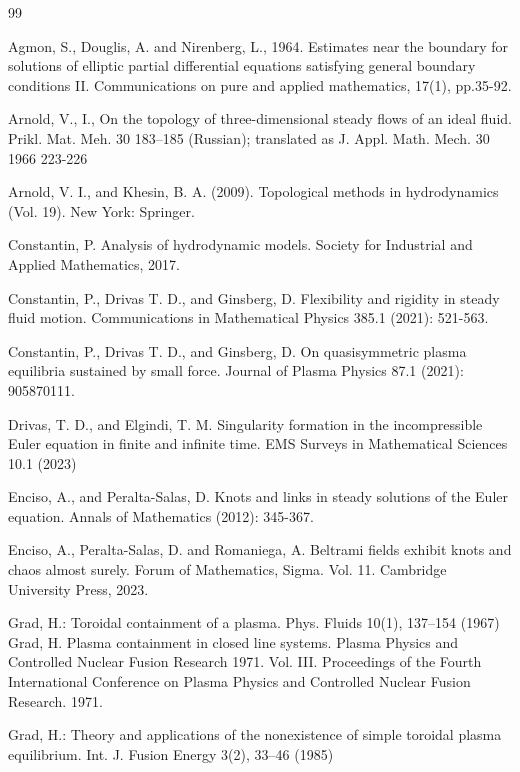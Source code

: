 \documentclass[11pt]{article}
\theoremstyle{plain}
\numberwithin{equation}{section}
\theoremstyle{remark}
\begin{document}
\begin{thebibliography}{99}

Agmon, S., Douglis, A. and Nirenberg, L., 1964. Estimates near the boundary for solutions of elliptic partial differential equations satisfying general boundary conditions II. Communications on pure and applied mathematics, 17(1), pp.35-92.

Arnold, V., I., On the topology of three-dimensional steady flows of an ideal fluid. Prikl.
Mat. Meh. 30 183–185 (Russian); translated as J. Appl. Math. Mech. 30 1966 223-226

Arnold, V. I., and Khesin, B. A. (2009). Topological methods in hydrodynamics (Vol. 19). New York: Springer.


Constantin, P. Analysis of hydrodynamic models. Society for Industrial and Applied Mathematics, 2017.

Constantin, P., Drivas T. D., and Ginsberg, D. Flexibility and rigidity in steady fluid motion. Communications in Mathematical Physics 385.1 (2021): 521-563.

 Constantin, P., Drivas T. D., and Ginsberg, D. On quasisymmetric plasma equilibria sustained by small force. Journal of Plasma Physics 87.1 (2021): 905870111.

Drivas, T. D., and Elgindi, T. M.  Singularity formation in the incompressible Euler equation in finite and infinite time. EMS Surveys in Mathematical Sciences 10.1 (2023)


Enciso, A., and Peralta-Salas, D. Knots and links in steady solutions of the Euler equation. Annals of Mathematics (2012): 345-367.


Enciso, A.,  Peralta-Salas, D.  and  Romaniega, A. Beltrami fields exhibit knots and chaos almost surely. Forum of Mathematics, Sigma. Vol. 11. Cambridge University Press, 2023.


Grad, H.: Toroidal containment of a plasma. Phys. Fluids 10(1), 137–154 (1967)
Grad, H. Plasma containment in closed line systems. Plasma Physics and Controlled Nuclear Fusion Research 1971. Vol. III. Proceedings of the Fourth International Conference on Plasma Physics and Controlled Nuclear Fusion Research. 1971.

Grad, H.: Theory and applications of the nonexistence of simple toroidal plasma equilibrium. Int. J. Fusion
Energy 3(2), 33–46 (1985)



\end{thebibliography}
\end{document}
